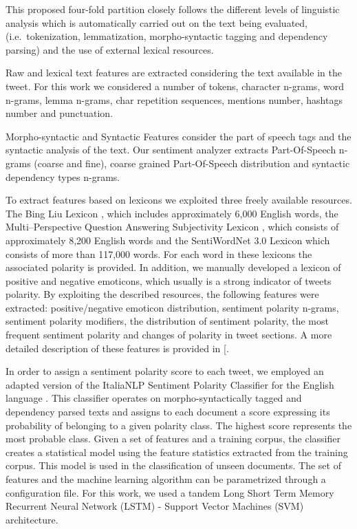 \documentclass[]{book}
\begin{document}
This proposed four-fold partition closely follows the different levels
of linguistic analysis which is automatically carried out on the text
being evaluated, (i.e.~tokenization, lemmatization, morpho-syntactic
tagging and dependency parsing) and the use of external lexical
resources.

Raw and lexical text features are extracted considering the text
available in the tweet. For this work we considered a number of tokens,
character n-grams, word n-grams, lemma n-grams, char repetition
sequences, mentions number, hashtags number and punctuation.

Morpho-syntactic and Syntactic Features consider the part of speech tags
and the syntactic analysis of the text. Our sentiment analyzer extracts
Part-Of-Speech n-grams (coarse and fine), coarse grained Part-Of-Speech
distribution and syntactic dependency types n-grams.

To extract features based on lexicons we exploited three freely
available resources. The Bing Liu Lexicon \citep{hu2004mining}, which
includes approximately 6,000 English words, the Multi--Perspective
Question Answering Subjectivity Lexicon \citep{wilson2005recognizing},
which consists of approximately 8,200 English words and the SentiWordNet
3.0 Lexicon \citep{baccianella2010sentiwordnet} which consists of more
than 117,000 words. For each word in these lexicons the associated
polarity is provided. In addition, we manually developed a lexicon of
positive and negative emoticons, which usually is a strong indicator of
tweets polarity. By exploiting the described resources, the following
features were extracted: positive/negative emoticon distribution,
sentiment polarity n-grams, sentiment polarity modifiers, the
distribution of sentiment polarity, the most frequent sentiment polarity
and changes of polarity in tweet sections. A more detailed description
of these features is provided in {[}\citet{cimino2014linguistically}.

In order to assign a sentiment polarity score to each tweet, we employed
an adapted version of the ItaliaNLP Sentiment Polarity Classifier for
the English language \citep{cimino2014linguistically}. This classifier
operates on morpho-syntactically tagged and dependency parsed texts and
assigns to each document a score expressing its probability of belonging
to a given polarity class. The highest score represents the most
probable class. Given a set of features and a training corpus, the
classifier creates a statistical model using the feature statistics
extracted from the training corpus. This model is used in the
classification of unseen documents. The set of features and the machine
learning algorithm can be parametrized through a configuration file. For
this work, we used a tandem Long Short Term Memory Recurrent Neural
Network (LSTM) - Support Vector Machines (SVM) architecture.
\end{document}
